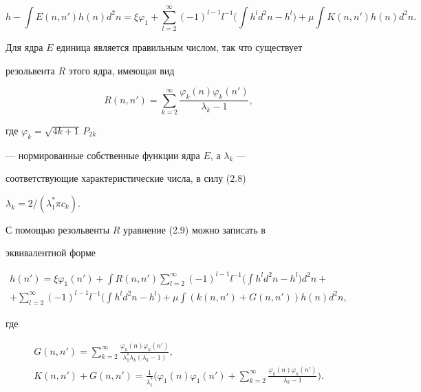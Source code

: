 \begin{equation}


h-\int E(n,n')h(n)d^2n=\xi\varphi_1+\sum^\infty_{l=2}


(-1)^{l-1}l^{-1}\biggl(\int h^l d^2n-h^l \biggr)+\mu


\int K(n,n')h(n)d^2n.


\tag{2.9}


\end{equation}


Для ядра $E$ единица является правильным числом, так что существует


резольвента $R$ этого ядра, имеющая вид


$$


R(n,n')=\sum^\infty_{k=2}


\frac{\varphi_k(n)\varphi_k(n')}{\lambda_k-1},


$$


где $\varphi_k=\sqrt{4k+1}\,P_{2k}$


--- нормированные собственные функции ядра $E$, а $\lambda_k$ ---


соответствующие характеристические числа, в силу (2.8)


$\lambda_k=2/(\lambda^*_1\pi c_k)$.





С помощью резольвенты $R$ уравнение (2.9) можно записать в


эквивалентной форме


\begin{multline}


h(n')=\xi\varphi_1(n')+\int R(n,n')\sum^\infty_{l=2}(-1)^{l-1}


l^{-1}\biggl(\int h^l d^2n-h^l \biggr)d^2n+ \\


+\sum^\infty_{l=2}(-1)^{l-1}l^{-1}


\biggl(\int h^l d^2n-h^l \biggr)+\mu\int(k(n,n')+G(n,n'))h(n)d^2n,


\tag{2.10}


\end{multline}


где


\begin{gather*}


G(n,n')=\sum^\infty_{k=2}


\frac{\varphi_k(n)\varphi_k(n')}


{\lambda^*_1\lambda_k(\lambda_k-1)}, \\


K(n,n')+G(n,n')=\frac{1}{\lambda^*_1}


\biggl(\varphi_1(n)\varphi_1(n')+\sum^\infty_{k=2}


\frac{\varphi_k(n)\varphi_k(n')}{\lambda_k-1}\biggr).


\end{gather*}


